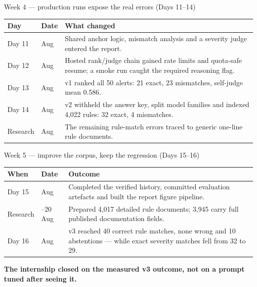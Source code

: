 \documentclass[aspectratio=169,11pt]{beamer}
\newcommand{\keytake}[1]{%
  \vfill
  \noindent\colorbox{accenttint}{%
    \begin{minipage}{\dimexpr\textwidth-2\fboxsep-2\fboxrule\relax}
      \vspace{2pt}
      \small\color{accent}\textbf{#1}
      \vspace{2pt}
    \end{minipage}}\par}
\begin{document}
\begin{frame}{Week 4 --- production runs expose the real errors (Days 11--14)}
  \leavevmode
  {\footnotesize
  \begin{tabular}{@{}>{\raggedright\arraybackslash}p{}
                    >{\raggedright\arraybackslash}p{}
                    >{\raggedright\arraybackslash}p{}@{}}
    \toprule
    \textbf{Day} & \textbf{Date} & \textbf{What changed} \\
    \midrule
    Day 11 & 10 Aug & Shared anchor logic, mismatch analysis and a severity judge entered the report. \\
    Day 12 & 11 Aug & Hosted rank/judge chain gained rate limits and quota-safe resume; a smoke run caught the required reasoning flag. \\
    Day 13 & 12 Aug & v1 ranked all 50 alerts: 21 exact, 23 mismatches, self-judge mean 0.586. \\
    Day 14 & 13 Aug & v2 withheld the answer key, split model families and indexed 4,022 rules: 32 exact, 4 mismatches. \\
    Research & 14 Aug & The remaining rule-match errors traced to generic one-line rule documents. \\
    \bottomrule
  \end{tabular}}
\end{frame}

\begin{frame}{Week 5 --- improve the corpus, keep the regression (Days 15--16)}
  \leavevmode
  {\small
  \begin{tabular}{@{}>{\raggedright\arraybackslash}p{}
                    >{\raggedright\arraybackslash}p{}
                    >{\raggedright\arraybackslash}p{}@{}}
    \toprule
    \textbf{When} & \textbf{Date} & \textbf{Outcome} \\
    \midrule
    Day 15 & 15 Aug & Completed the verified history, committed evaluation artefacts and built the report figure pipeline. \\
    Research & 17--20 Aug & Prepared 4,017 detailed rule documents; 3,945 carry full published documentation fields. \\
    Day 16 & 21 Aug & v3 reached 40 correct rule matches, none wrong and 10 abstentions --- while exact severity matches fell from 32 to 29. \\
    \bottomrule
  \end{tabular}}
  \keytake{The internship closed on the measured v3 outcome, not on a prompt tuned after seeing it.}
\end{frame}
\end{document}
